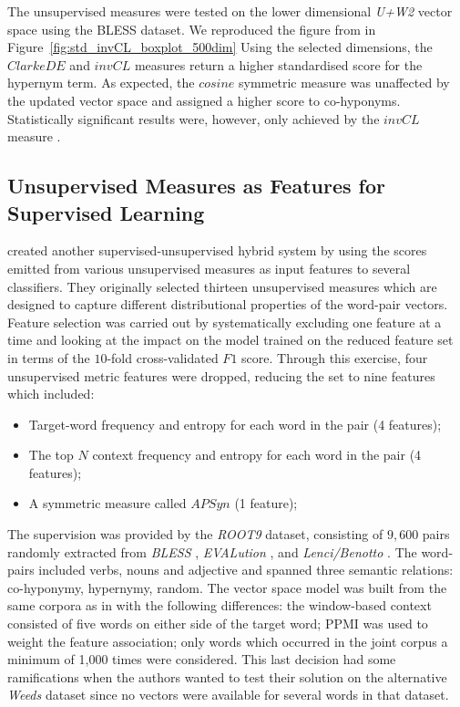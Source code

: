 The unsupervised measures were tested on the lower dimensional \textit{U+W2} vector space using the BLESS dataset.  We reproduced the figure from \citep{roller2014inclusive} in Figure~\ref{fig:std_invCL_boxplot_500dim}
Using the selected dimensions, the $ClarkeDE$ and $invCL$ measures return a higher standardised score for the hypernym term.  As expected, the $cosine$ symmetric measure was unaffected by the updated vector space and assigned a higher score to co-hyponyms.  Statistically significant results were, however, only achieved by the $invCL$ measure \citep{roller2014inclusive}.

\subsection{Unsupervised Measures as Features for Supervised Learning}
\citeauthor{santus2016nine} created another supervised-unsupervised hybrid system by using the scores emitted from various unsupervised measures as input features to several classifiers.  They originally selected thirteen unsupervised measures which are designed to capture different distributional properties of the word-pair vectors.  Feature selection was carried out by systematically excluding one feature at a time and looking at the impact on the model trained on the reduced feature set in terms of the $10$-fold cross-validated $F1$ score.  Through this exercise, four unsupervised metric features were dropped, reducing the set to nine features which included:
\begin{itemize}
    \item Target-word frequency and entropy for each word in the pair (4 features);
    \item The top $N$ context frequency and entropy for each word in the pair (4 features); 
    \item A symmetric measure called $APSyn$ \citep{santus2016unsupervised} (1 feature);
\end{itemize}
 
The supervision was provided by the \textit{ROOT9} dataset, consisting of $9,600$ pairs randomly extracted from \textit{BLESS} \citep{Baroni2011}, \textit{EVALution} \citep{santus2015evalution}, and \textit{Lenci/Benotto} \citep{benotto2015distributional}.  The word-pairs included verbs, nouns and adjective and spanned three semantic relations: co-hyponymy, hypernymy, random.  The vector space model was built from the same corpora as in \citep{santus2014chasing} with the following differences: the window-based context consisted of five words on either side of the target word; \ac{PPMI} was used to weight the feature association; only words which occurred in the joint corpus a minimum of 1,000 times were considered.  This last decision had some ramifications when the authors wanted to test their solution on the alternative \textit{Weeds} dataset \citep{weeds2014learning} since no vectors were available for several words in that dataset.

